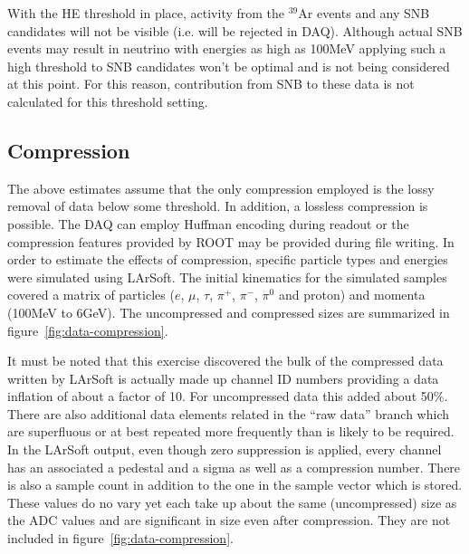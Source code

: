 %

With the HE threshold in place, activity from the $^{39}$Ar events and any SNB
candidates will not be visible (i.e. will be rejected in DAQ).
Although actual SNB events may result in neutrino with energies as high as
100MeV applying such a high threshold to SNB candidates won't be optimal and is not being considered at this point.
For this reason, contribution from SNB to these data is not calculated for this threshold setting.


\subsection{Compression}

The above estimates assume that the only compression employed is the
lossy removal of data below some threshold.
In addition, a lossless compression is possible.
The DAQ can employ Huffman encoding during readout or the compression
features provided by ROOT may be provided during file writing.
In order to estimate the effects of compression, specific particle
types and energies were simulated using LArSoft.
The initial kinematics for the simulated samples covered a matrix of
particles ($e$, $\mu$, $\tau$, $\pi^+$, $\pi^-$, $\pi^0$ and proton) and momenta
(100MeV to 6GeV).
The uncompressed and compressed sizes are summarized in figure~\ref{fig:data-compression}.




It must be noted that this exercise discovered the bulk of the
compressed data written by LArSoft is actually made up channel ID
numbers providing a data inflation of about a factor of 10.
For uncompressed data this added about 50\%.
There are also additional data elements related in the ``raw data''
branch which are superfluous or at best repeated more frequently than
is likely to be required.
In the LArSoft output, even though zero suppression is applied, every
channel has an associated a pedestal and a sigma as well as a
compression number.
There is also a sample count in addition to the one in the sample
vector which is stored.
These values do no vary yet each take up about the same (uncompressed)
size as the ADC values and are significant in size even after
compression.
They are not included in figure~\ref{fig:data-compression}.

